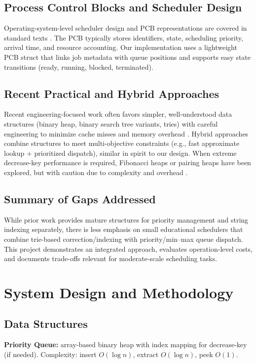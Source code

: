 \documentclass[conference,10pt]{IEEEtran}
\begin{document}
\subsection{Process Control Blocks and Scheduler Design}
Operating-system-level scheduler design and PCB representations are covered in standard texts \cite{silberschatz2018operating, tanenbaum2015modern}. The PCB typically stores identifiers, state, scheduling priority, arrival time, and resource accounting. Our implementation uses a lightweight PCB struct that links job metadata with queue positions and supports easy state transitions (ready, running, blocked, terminated).

\subsection{Recent Practical and Hybrid Approaches}
Recent engineering-focused work often favors simpler, well-understood data structures (binary heap, binary search tree variants, tries) with careful engineering to minimize cache misses and memory overhead \cite{weiss2014data}. Hybrid approaches combine structures to meet multi-objective constraints (e.g., fast approximate lookup + prioritized dispatch), similar in spirit to our design. When extreme decrease-key performance is required, Fibonacci heaps or pairing heaps have been explored, but with caution due to complexity and overhead \cite{fredman1987fibonacci}.

\subsection{Summary of Gaps Addressed}
While prior work provides mature structures for priority management and string indexing separately, there is less emphasis on small educational schedulers that combine trie-based correction/indexing with priority/min--max queue dispatch. This project demonstrates an integrated approach, evaluates operation-level costs, and documents trade-offs relevant for moderate-scale scheduling tasks.

\section{System Design and Methodology}

\subsection{Data Structures}
\textbf{Priority Queue:} array-based binary heap with index mapping for decrease-key (if needed). Complexity: insert \(O(\log n)\), extract \(O(\log n)\), peek \(O(1)\).
\end{document}
